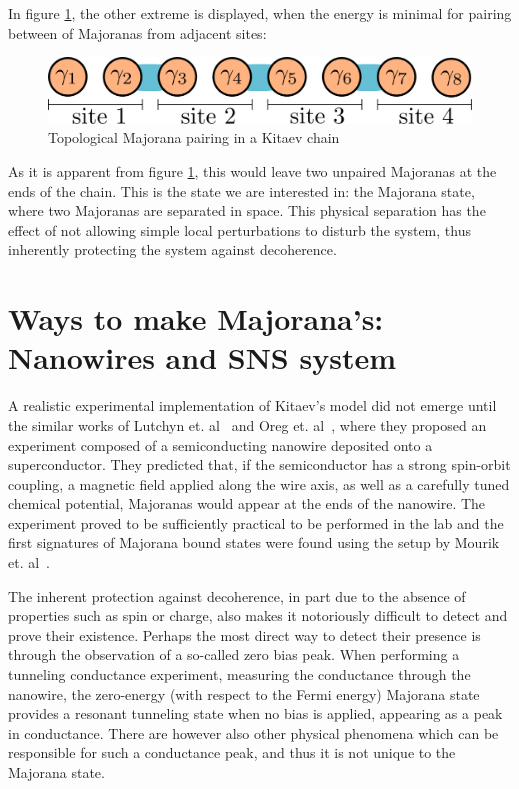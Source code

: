 	In figure \ref{fig:topological_majoranas}, the other extreme is displayed, when the energy is minimal for pairing between of Majoranas from adjacent sites:
	\begin{figure}[htb!]
	\centering
	\includegraphics[width=0.95\columnwidth]{images/majorana_topological_pairing}
	\caption{Topological Majorana pairing in a Kitaev chain}
	\label{fig:topological_majoranas}
	\end{figure}
		
	As it is apparent from figure \ref{fig:topological_majoranas}, this would leave two unpaired Majoranas at the ends of the chain.
	This is the state we are interested in: the Majorana state, where two Majoranas are separated in space.
	This physical separation has the effect of not allowing simple local perturbations to disturb the system, thus inherently protecting the system against decoherence.


\section{Ways to make Majorana's: Nanowires and SNS system}

	A realistic experimental implementation of Kitaev's model did not emerge until the similar works of Lutchyn et. al~\cite{lutchyn_majorana_2010} and Oreg et. al~\cite{ oreg_helical_2010}, where they proposed an experiment composed of a semiconducting nanowire deposited onto a superconductor.
	They predicted that, if the semiconductor has a strong spin-orbit coupling, a magnetic field applied along the wire axis, as well as a carefully tuned chemical potential, Majoranas would appear at the ends of the nanowire.
	The experiment proved to be sufficiently practical to be performed in the lab and the first signatures of Majorana bound states were found using the setup by Mourik et. al~\cite{mourik_signatures_2012}.

	The inherent protection against decoherence, in part due to the absence of properties such as spin or charge, also makes it notoriously difficult to detect and prove their existence.
	Perhaps the most direct way to detect their presence is through the observation of a so-called zero bias peak.
	When performing a tunneling conductance experiment, measuring the conductance through the nanowire, the zero-energy (with respect to the Fermi energy) Majorana state provides a resonant tunneling state when no bias is applied, appearing as a peak in conductance.
	There are however also other physical phenomena which can be responsible for such a conductance peak, and thus it is not unique to the Majorana state.


